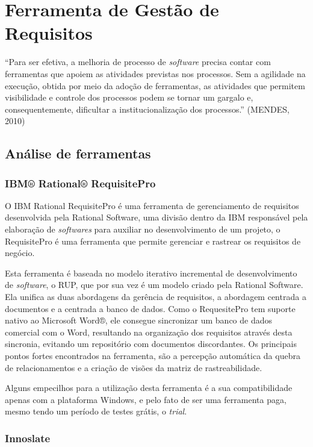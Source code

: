 \chapter{Ferramenta de Gestão de Requisitos}

“Para ser efetiva, a melhoria de processo de \textit{software} precisa contar com ferramentas que apoiem as atividades previstas nos processos. Sem a agilidade na execução, obtida por meio da adoção de ferramentas, as atividades que permitem visibilidade e controle dos processos podem se tornar um gargalo e, consequentemente, dificultar a institucionalização dos processos.” (MENDES, 2010)

\section{Análise de ferramentas}

\subsection{IBM® Rational® RequisitePro}

O IBM Rational RequisitePro é uma ferramenta de gerenciamento de requisitos desenvolvida pela Rational Software, uma divisão dentro da IBM responsável pela elaboração de \textit{softwares} para auxiliar no desenvolvimento de um projeto, o RequisitePro é uma ferramenta que permite gerenciar e rastrear os requisitos de negócio. 

Esta ferramenta é baseada no modelo iterativo incremental de desenvolvimento de \textit{software}, o RUP, que por sua vez é um modelo criado pela Rational Software. Ela unifica as duas abordagens da gerência de requisitos, a abordagem centrada a documentos e a centrada a banco de dados. Como o RequesitePro tem suporte nativo ao Microsoft Word®, ele consegue sincronizar um banco de dados comercial com o Word, resultando na organização dos requisitos através desta sincronia, evitando um repositório com documentos discordantes. Os principais pontos fortes encontrados na ferramenta, são a percepção automática da quebra de relacionamentos e a criação de visões da matriz de rastreabilidade. 

Alguns empecilhos para a utilização desta ferramenta é a sua compatibilidade apenas com a plataforma Windows, e pelo fato de ser uma ferramenta paga, mesmo tendo um período de testes grátis, o \textit{trial}.

\subsection{Innoslate}

